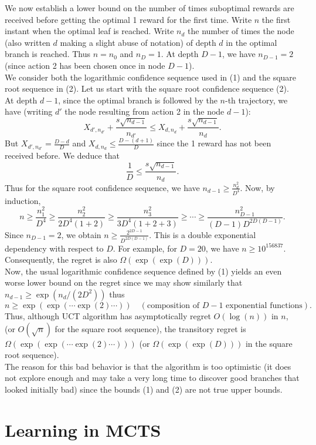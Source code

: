 \documentclass[11pt]{article}
\begin{document}
We now establish a lower bound on the number of times suboptimal rewards are received before getting the optimal 1 reward for the first time. Write \(n\) the first instant when the optimal leaf is reached. Write \(n_d\) the number of times the node (also written \(d\) making a slight abuse of notation) of depth \(d\) in the optimal branch is reached. Thus \(n = n_0\) and \(n_D = 1\). At depth \(D - 1\), we have \(n_{D-1} = 2\) (since action 2 has been chosen once in node \(D - 1\)).\\
We consider both the logarithmic confidence sequence used in (1) and the square root sequence in (2). Let us start with the square root confidence sequence (2). At depth \(d - 1\), since the optimal branch is followed by the \(n\)-th trajectory, we have (writing \(d'\) the node resulting from action 2 in the node \(d - 1\)):
\[
X_{d',n_{d'}} + \frac{s\sqrt{n_{d-1}}}{n_{d'}} \leq X_{d,n_d} + \frac{s\sqrt{n_{d-1}}}{n_d}.
\]
But \(X_{d',n_{d'}} = \frac{D - d}{D}\) and \(X_{d,n_d} \leq \frac{D - (d + 1)}{D}\) since the 1 reward has not been received before. We deduce that
\[
\frac{1}{D} \leq \frac{s\sqrt{n_{d-1}}}{n_d}.
\]
Thus for the square root confidence sequence, we have \(n_{d-1} \geq \frac{n_d^2}{D^4}\). Now, by induction,
\[
n \geq \frac{n_1^2}{D^4} \geq \frac{n_2^2}{2D^4(1+2)} \geq \frac{n_3^2}{3D^4(1+2+3)} \geq \cdots \geq \frac{n_{D-1}^2}{(D-1)D^{2D(D-1)}}.
\]
Since \(n_{D-1} = 2\), we obtain \(n \geq \frac{2^{2D-1}}{D^{2D(D-1)}}\). This is a double exponential dependency with respect to \(D\). For example, for \(D = 20\), we have \(n \geq 10^{156837}\). Consequently, the regret is also \(\Omega(\exp(\exp(D)))\).\\
Now, the usual logarithmic confidence sequence defined by (1) yields an even worse lower bound on the regret since we may show similarly that \(n_{d-1} \geq \exp(n_d/(2D^2))\) thus
\[
n \geq \exp(\exp(\cdots \exp(2) \cdots)) \quad (\text{composition of } D - 1 \text{ exponential functions}).
\]
Thus, although UCT algorithm has asymptotically regret \(O(\log(n))\) in \(n\), (or \(O(\sqrt{n})\) for the square root sequence), the transitory regret is \(\Omega(\exp(\exp(\cdots \exp(2) \cdots)))\) (or \(\Omega(\exp(\exp(D)))\) in the square root sequence).\\
The reason for this bad behavior is that the algorithm is too optimistic (it does not explore enough and may take a very long time to discover good branches that looked initially bad) since the bounds (1) and (2) are not true upper bounds.\\
\section{Learning in MCTS}
\end{document}
